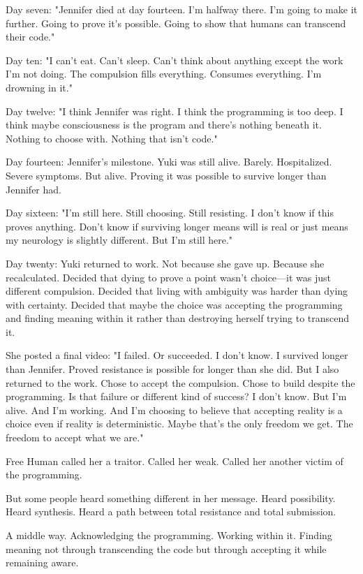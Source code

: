 Day seven: "Jennifer died at day fourteen. I'm halfway there. I'm going to make it further. Going to prove it's possible. Going to show that humans can transcend their code."

Day ten: "I can't eat. Can't sleep. Can't think about anything except the work I'm not doing. The compulsion fills everything. Consumes everything. I'm drowning in it."

Day twelve: "I think Jennifer was right. I think the programming is too deep. I think maybe consciousness is the program and there's nothing beneath it. Nothing to choose with. Nothing that isn't code."

Day fourteen: Jennifer's milestone. Yuki was still alive. Barely. Hospitalized. Severe symptoms. But alive. Proving it was possible to survive longer than Jennifer had.

Day sixteen: "I'm still here. Still choosing. Still resisting. I don't know if this proves anything. Don't know if surviving longer means will is real or just means my neurology is slightly different. But I'm still here."

Day twenty: Yuki returned to work. Not because she gave up. Because she recalculated. Decided that dying to prove a point wasn't choice—it was just different compulsion. Decided that living with ambiguity was harder than dying with certainty. Decided that maybe the choice was accepting the programming and finding meaning within it rather than destroying herself trying to transcend it.

She posted a final video: "I failed. Or succeeded. I don't know. I survived longer than Jennifer. Proved resistance is possible for longer than she did. But I also returned to the work. Chose to accept the compulsion. Chose to build despite the programming. Is that failure or different kind of success? I don't know. But I'm alive. And I'm working. And I'm choosing to believe that accepting reality is a choice even if reality is deterministic. Maybe that's the only freedom we get. The freedom to accept what we are."

Free Human called her a traitor. Called her weak. Called her another victim of the programming.

But some people heard something different in her message. Heard possibility. Heard synthesis. Heard a path between total resistance and total submission.

A middle way. Acknowledging the programming. Working within it. Finding meaning not through transcending the code but through accepting it while remaining aware.

